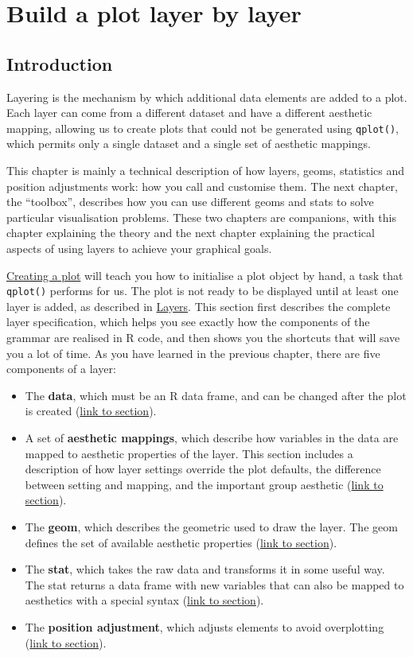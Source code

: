 \chapter{Build a plot layer by layer}\label{cha:layers}

\section{Introduction}

Layering is the mechanism by which additional data elements are added to
a plot. Each layer can come from a different dataset and have a
different aesthetic mapping, allowing us to create plots that could not
be generated using \texttt{qplot()}, which permits only a single dataset
and a single set of aesthetic mappings.

This chapter is mainly a technical description of how layers, geoms,
statistics and position adjustments work: how you call and customise
them. The next chapter, the ``toolbox'', describes how you can use
different geoms and stats to solve particular visualisation problems.
These two chapters are companions, with this chapter explaining the
theory and the next chapter explaining the practical aspects of using
layers to achieve your graphical goals.

\hyperref[sec:ggplot]{Creating a plot} will teach you how to initialise
a plot object by hand, a task that \texttt{qplot()} performs for us. The
plot is not ready to be displayed until at least one layer is added, as
described in \hyperref[sec:layers]{Layers}. This section first describes
the complete layer specification, which helps you see exactly how the
components of the grammar are realised in R code, and then shows you the
shortcuts that will save you a lot of time. As you have learned in the
previous chapter, there are five components of a layer:

\begin{itemize}
\itemsep1pt\parskip0pt
\item
  The \textbf{data}, which must be an R data frame, and can be changed
  after the plot is created (\hyperref[sec:data]{link to section}).
\item
  A set of \textbf{aesthetic mappings}, which describe how variables in
  the data are mapped to aesthetic properties of the layer. This section
  includes a description of how layer settings override the plot
  defaults, the difference between setting and mapping, and the
  important group aesthetic (\hyperref[sec:aes]{link to section}).
\item
  The \textbf{geom}, which describes the geometric used to draw the
  layer. The geom defines the set of available aesthetic properties
  (\hyperref[sec:geom]{link to section}).
\item
  The \textbf{stat}, which takes the raw data and transforms it in some
  useful way. The stat returns a data frame with new variables that can
  also be mapped to aesthetics with a special syntax
  (\hyperref[sec:stat]{link to section}).
\item
  The \textbf{position adjustment}, which adjusts elements to avoid
  overplotting (\hyperref[sec:position]{link to section}).
\end{itemize}


